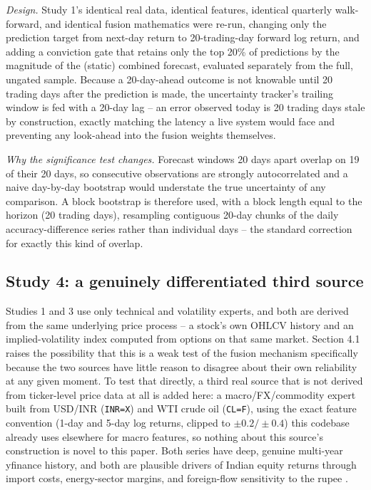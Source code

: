 \documentclass[10pt,a4paper,twocolumn]{article}
\begin{document}
\textit{Design.} Study 1's identical real data, identical features, identical quarterly walk-forward, and identical fusion mathematics were re-run, changing only the prediction target from next-day return to 20-trading-day forward log return, and adding a conviction gate that retains only the top 20\% of predictions by the magnitude of the (static) combined forecast, evaluated separately from the full, ungated sample. Because a 20-day-ahead outcome is not knowable until 20 trading days after the prediction is made, the uncertainty tracker's trailing window is fed with a 20-day lag -- an error observed today is 20 trading days stale by construction, exactly matching the latency a live system would face and preventing any look-ahead into the fusion weights themselves.

\textit{Why the significance test changes.} Forecast windows 20 days apart overlap on 19 of their 20 days, so consecutive observations are strongly autocorrelated and a naive day-by-day bootstrap would understate the true uncertainty of any comparison. A block bootstrap is therefore used, with a block length equal to the horizon (20 trading days), resampling contiguous 20-day chunks of the daily accuracy-difference series rather than individual days -- the standard correction for exactly this kind of overlap.

\subsection{Study 4: a genuinely differentiated third source}

Studies 1 and 3 use only technical and volatility experts, and both are derived from the same underlying price process -- a stock's own OHLCV history and an implied-volatility index computed from options on that same market. Section 4.1 raises the possibility that this is a weak test of the fusion mechanism specifically because the two sources have little reason to disagree about their own reliability at any given moment. To test that directly, a third real source that is not derived from ticker-level price data at all is added here: a macro/FX/commodity expert built from USD/INR (\texttt{INR=X}) and WTI crude oil (\texttt{CL=F}), using the exact feature convention (1-day and 5-day log returns, clipped to $\pm0.2/\pm0.4$) this codebase already uses elsewhere for macro features, so nothing about this source's construction is novel to this paper. Both series have deep, genuine multi-year yfinance history, and both are plausible drivers of Indian equity returns through import costs, energy-sector margins, and foreign-flow sensitivity to the rupee \cite{chenrollross1986}.
\end{document}

